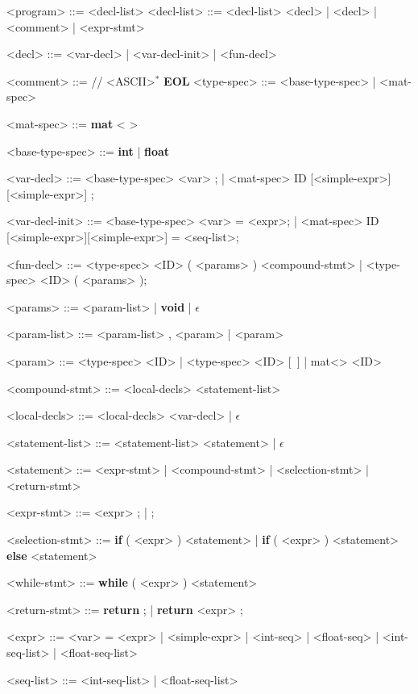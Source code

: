 \begin{grammar}
	<program> ::= <decl-list> 
	<decl-list> ::= <decl-list> <decl> | <decl> | <comment> | <expr-stmt>
	
	<decl> ::= <var-decl> | <var-decl-init> | <fun-decl>
	
	<comment> ::= // <ASCII>$^*$ \textbf{EOL}
	<type-spec> ::= <base-type-spec> | <mat-spec>
	
	<mat-spec> ::= \textbf{mat} \textless <base-type-spec> \textgreater 

	<base-type-spec> ::= \textbf{int} | \textbf{float}

	<var-decl> ::= <base-type-spec> <var> ; | <mat-spec> ID [<simple-expr>][<simple-expr>] ;
	
	<var-decl-init> ::= <base-type-spec> <var> = <expr>; | <mat-spec> ID [<simple-expr>][<simple-expr>] = {<seq-list>};
	
	<fun-decl> ::= <type-spec> <ID> ( <params> ) <compound-stmt> | <type-spec> <ID> ( <params> );
	
	<params> ::= <param-list> | \textbf{void} | $\epsilon$
	
	<param-list> ::= <param-list> , <param> | <param> 
	
	<param> ::= <type-spec> <ID> | <type-spec> <ID> $[$\ $]$ | mat\textless<type-spec-base>> <ID> 
	
	<compound-stmt> ::= { <local-decls> <statement-list> } 
	
	<local-decls> ::= <local-decls> <var-decl> | $\epsilon$ 
	
	<statement-list> ::= <statement-list> <statement> | $\epsilon$
	
	<statement> ::= <expr-stmt> | <compound-stmt> | <selection-stmt> \alt <while-stmt> | <return-stmt> 
	
	<expr-stmt> ::= <expr> ; | ; 
	
	<selection-stmt> ::= \textbf{if} ( <expr> ) <statement> | \textbf{if} ( <expr> ) <statement> \textbf{else} <statement> 
	
	<while-stmt> ::= \textbf{while} ( <expr> ) <statement> 
	
	<return-stmt> ::= \textbf{return} ; | \textbf{return} <expr> ;
	
	<expr> ::= <var> = <expr> | <simple-expr> | {<int-seq>} | {<float-seq>} | {<int-seq-list>} | {<float-seq-list>}
	
	<seq-list> ::= <int-seq-list> | <float-seq-list>


\end{grammar}
